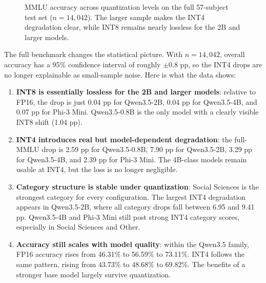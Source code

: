 \documentclass[11pt,a4paper]{article}
\begin{document}
\begin{figure}[htbp]
\centering
{}
\caption{MMLU accuracy across quantization levels on the full 57-subject test set ($n=14{,}042$). The larger sample makes the INT4 degradation clear, while INT8 remains nearly lossless for the 2B and larger models.}
\label{fig:mmlu_accuracy}
\end{figure}

The full benchmark changes the statistical picture. With $n=14{,}042$, overall accuracy has a 95\% confidence interval of roughly $\pm 0.8$ pp, so the INT4 drops are no longer explainable as small-sample noise. Here is what the data shows:

\begin{enumerate}[leftmargin=*,nosep]
    \item \textbf{INT8 is essentially lossless for the 2B and larger models}: relative to FP16, the drop is just 0.04 pp for Qwen3.5-2B, 0.04 pp for Qwen3.5-4B, and 0.07 pp for Phi-3 Mini. Qwen3.5-0.8B is the only model with a clearly visible INT8 shift (1.04 pp).

    \item \textbf{INT4 introduces real but model-dependent degradation}: the full-MMLU drop is 2.59 pp for Qwen3.5-0.8B, 7.90 pp for Qwen3.5-2B, 3.29 pp for Qwen3.5-4B, and 2.39 pp for Phi-3 Mini. The 4B-class models remain usable at INT4, but the loss is no longer negligible.

    \item \textbf{Category structure is stable under quantization}: Social Sciences is the strongest category for every configuration. The largest INT4 degradation appears in Qwen3.5-2B, where all category drops fall between 6.95 and 9.41 pp. Qwen3.5-4B and Phi-3 Mini still post strong INT4 category scores, especially in Social Sciences and Other.

    \item \textbf{Accuracy still scales with model quality}: within the Qwen3.5 family, FP16 accuracy rises from 46.31\% to 56.59\% to 73.11\%. INT4 follows the same pattern, rising from 43.73\% to 48.68\% to 69.82\%. The benefits of a stronger base model largely survive quantization.
\end{enumerate}
\end{document}
